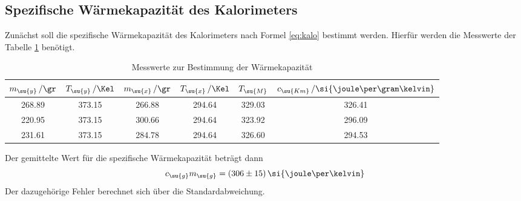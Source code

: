 \subsection{Spezifische Wärmekapazität des Kalorimeters}
Zunächst soll die spezifische Wärmekapazität des Kalorimeters nach Formel
\eqref{eq:kalo} bestimmt werden. Hierfür werden die Messwerte der Tabelle
\ref{tab:kalo} benötigt.
\begin{table}
  \centering
  \begin{tabular}{c c c c c c}
    \toprule
    $m_\su{y}\,/\gr$ & $T_\su{y}\,/\Kel$ & $m_\su{x}\,/\gr$ & $T_\su{x}\,/\Kel$
    & $T_\su{M}$ & $c_\su{Km}\,/\si{\joule\per\gram\kelvin}$ \\
    \midrule
    268.89 & 373.15 & 266.88 & 294.64 & 329.03 & 326.41\\
    220.95 & 373.15 & 300.66 & 294.64 & 323.92 & 296.09\\
    231.61 & 373.15 & 284.78 & 294.64 & 326.60 & 294.53\\
    \bottomrule
  \end{tabular}
  \caption{Messwerte zur Bestimmung der Wärmekapazität}
  \label{tab:kalo}
\end{table}
Der gemittelte Wert für die spezifische Wärmekapazität beträgt dann
\begin{equation*}
  c_\su{g}m_\su{g} = (306\pm15)\,\si{\joule\per\kelvin}
\end{equation*}
Der dazugehörige Fehler berechnet sich über die Standardabweichung.
\newpage
